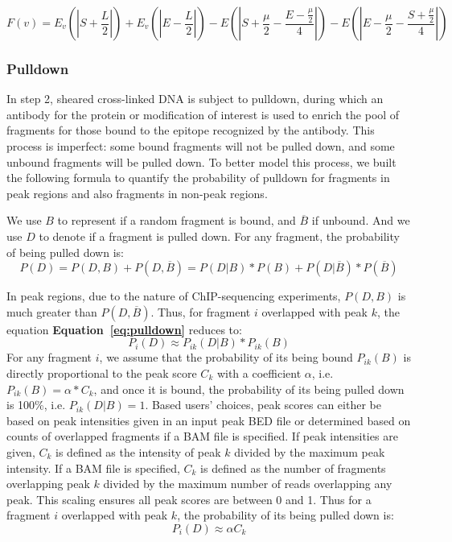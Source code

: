 \documentclass[12pt]{article}
\begin{document}
\begin{equation}
F(v) = E_v(|S + \frac{L}{2}|) + E_v(|E - \frac{L}{2}|) - E(|S + \frac{\mu}{2} - \frac{E- \frac{\mu}{2}}{4}|) - E(|E- \frac{\mu}{2} - \frac{S + \frac{\mu}{2}}{4}|)
\end{equation}

\subsubsection*{Pulldown}
In step 2, sheared cross-linked DNA is subject to pulldown, during which an antibody for the protein or modification of interest is used to enrich the pool of fragments for those bound to the epitope recognized by the antibody.
This process is imperfect: some bound fragments will not be pulled down, and some unbound fragments will be pulled down.
To better model this process, we built the following formula to quantify the probability of pulldown for fragments in peak regions and also fragments in non-peak regions.

We use $B$ to represent if a random fragment is bound, and $\overline{B}$ if unbound. And we use $D$ to denote if a fragment is pulled down.
For any fragment, the probability of being pulled down is:
\begin{equation} \label{eq:pulldown}
    P(D) = P(D, B) + P(D, \overline{B}) = P(D|B)*P(B) + P(D|\overline{B})*P(\overline{B})
\end{equation}

In peak regions, due to the nature of ChIP-sequencing experiments, $P(D, B)$ is much greater than $P(D, \overline{B})$.
Thus, for fragment $i$ overlapped with peak $k$, the equation \textbf{Equation~\ref{eq:pulldown}} reduces to:
\begin{equation} \label{eq:pulldown_peak}
    P_i(D) \approx P_{ik}(D|B)*P_{ik}(B)
\end{equation}
For any fragment $i$, we assume that the probability of its being bound $P_{ik}(B)$ is directly proportional to the peak score $C_k$ with a coefficient $\alpha$, i.e. $P_{ik}(B) = \alpha*C_k$,
and once it is bound, the probability of its being pulled down is 100\%, i.e. $P_{ik}(D|B) = 1$.
Based users' choices, peak scores can either be based on peak intensities given in an input peak BED file or determined based on counts of overlapped fragments if a BAM file is specified.
If peak intensities are given, $C_k$ is defined as the intensity of peak $k$ divided by the maximum peak intensity.
If a BAM file is specified, $C_k$ is defined as the number of fragments overlapping peak $k$ divided by the maximum number of reads overlapping any peak.
This scaling ensures all peak scores are between 0 and 1. Thus for a fragment $i$ overlapped with peak $k$, the probability of its being pulled down is:
\begin{equation} \label{eq:pulldown_peak_in_practice}
P_i(D) \approx \alpha C_k
\end{equation}
\end{document}
